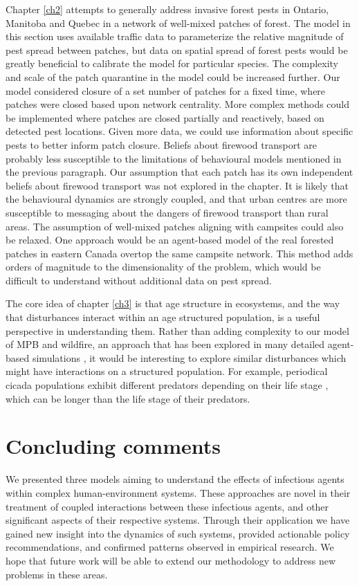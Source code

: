Chapter \ref{ch2} attempts to generally address invasive forest pests in Ontario, Manitoba and Quebec in a network of well-mixed patches of forest. The model in this section uses available traffic data to parameterize the relative magnitude of pest spread between patches, but data on spatial spread of forest pests would be greatly beneficial to calibrate the model for particular species. The complexity and scale of the patch quarantine in the model could be increased further. Our model considered closure of a set number of patches for a fixed time, where patches were closed based upon network centrality. More complex methods could be implemented where patches are closed partially and reactively, based on detected pest locations. Given more data, we could use information about specific pests to better inform patch closure. Beliefs about firewood transport are probably less susceptible to the limitations  of behavioural models mentioned in the previous paragraph. Our assumption that each patch has its own independent beliefs about firewood transport was not explored in the chapter. It is likely that the behavioural dynamics are strongly coupled, and that urban centres are more susceptible to messaging about the dangers of firewood transport than rural areas. The assumption of well-mixed patches aligning with campsites could also be relaxed. One approach would be an agent-based model of the real forested patches in eastern Canada overtop the same campsite network. This method adds orders of magnitude to the dimensionality of the problem, which would be difficult to understand without additional data on pest spread.  

The core idea of chapter \ref{ch3} is that age structure in ecosystems, and the way that disturbances interact within an age structured population, is a useful perspective in understanding them. Rather than adding complexity to our model of MPB and wildfire, an approach that has been explored in many detailed agent-based simulations \cite{caldwell2013simulated,perrakis2014modeling,ager2007modeling,loehman2017interactions}, it would be interesting to explore similar disturbances which might have interactions on a structured population. For example, periodical cicada populations exhibit different predators depending on their life stage \cite{lloyd1966periodical}, which can be longer than the life stage of their predators. 

\section{Concluding comments}

We presented three models aiming to understand the effects of infectious agents within complex human-environment systems. These approaches are novel in their treatment of coupled interactions between these infectious agents, and other significant aspects of their respective systems. Through their application we have gained new insight into the dynamics of such systems, provided actionable policy recommendations, and confirmed patterns observed in empirical research. We hope that future work will be able to extend our methodology to address new problems in these areas.